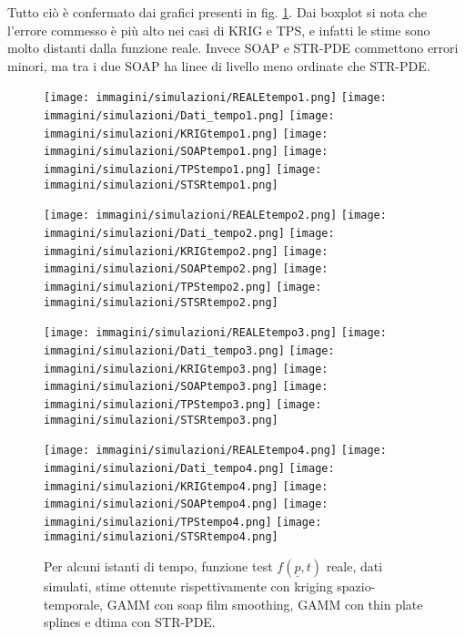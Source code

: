 \documentclass[a4paper,11pt,twoside,openright]{book}							%
\begin{document}
Tutto ciò è confermato dai grafici presenti in fig. \ref{fig:confronto_altri_metodi_nocov}. Dai boxplot si nota che l'errore commesso è più alto nei casi di KRIG e TPS, e infatti le stime sono molto distanti dalla funzione reale. Invece SOAP e STR-PDE commettono errori minori, ma tra i due SOAP ha linee di livello meno ordinate che STR-PDE. 

\begin{landscape}
\begin{figure}
\centering
\texttt{[image: immagini/simulazioni/REALEtempo1.png]}
\texttt{[image: immagini/simulazioni/Dati\_tempo1.png]}
\texttt{[image: immagini/simulazioni/KRIGtempo1.png]}
\texttt{[image: immagini/simulazioni/SOAPtempo1.png]}
\texttt{[image: immagini/simulazioni/TPStempo1.png]}
\texttt{[image: immagini/simulazioni/STSRtempo1.png]}

\texttt{[image: immagini/simulazioni/REALEtempo2.png]}
\texttt{[image: immagini/simulazioni/Dati\_tempo2.png]}
\texttt{[image: immagini/simulazioni/KRIGtempo2.png]}
\texttt{[image: immagini/simulazioni/SOAPtempo2.png]}
\texttt{[image: immagini/simulazioni/TPStempo2.png]}
\texttt{[image: immagini/simulazioni/STSRtempo2.png]}

\texttt{[image: immagini/simulazioni/REALEtempo3.png]}
\texttt{[image: immagini/simulazioni/Dati\_tempo3.png]}
\texttt{[image: immagini/simulazioni/KRIGtempo3.png]}
\texttt{[image: immagini/simulazioni/SOAPtempo3.png]}
\texttt{[image: immagini/simulazioni/TPStempo3.png]}
\texttt{[image: immagini/simulazioni/STSRtempo3.png]}

\texttt{[image: immagini/simulazioni/REALEtempo4.png]}
\texttt{[image: immagini/simulazioni/Dati\_tempo4.png]}
\texttt{[image: immagini/simulazioni/KRIGtempo4.png]}
\texttt{[image: immagini/simulazioni/SOAPtempo4.png]}
\texttt{[image: immagini/simulazioni/TPStempo4.png]}
\texttt{[image: immagini/simulazioni/STSRtempo4.png]}

\caption{Per alcuni istanti di tempo, funzione test $f(\underline p,t)$ reale, dati simulati, stime ottenute rispettivamente con kriging spazio-temporale, GAMM con soap film smoothing, GAMM con thin plate splines e dtima con STR-PDE.}
\label{fig:confronto_altri_metodi_nocov}
\end{figure}
\end{landscape}
\end{document}
